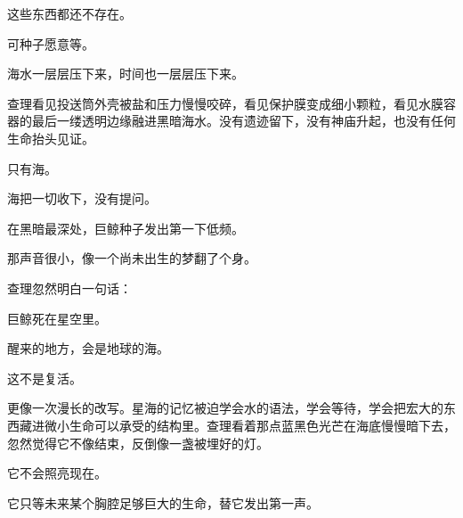 这些东西都还不存在。

可种子愿意等。

海水一层层压下来，时间也一层层压下来。

查理看见投送筒外壳被盐和压力慢慢咬碎，看见保护膜变成细小颗粒，看见水膜容器的最后一缕透明边缘融进黑暗海水。没有遗迹留下，没有神庙升起，也没有任何生命抬头见证。

只有海。

海把一切收下，没有提问。

在黑暗最深处，巨鲸种子发出第一下低频。

那声音很小，像一个尚未出生的梦翻了个身。

查理忽然明白一句话：

巨鲸死在星空里。

醒来的地方，会是地球的海。

这不是复活。

更像一次漫长的改写。星海的记忆被迫学会水的语法，学会等待，学会把宏大的东西藏进微小生命可以承受的结构里。查理看着那点蓝黑色光芒在海底慢慢暗下去，忽然觉得它不像结束，反倒像一盏被埋好的灯。

它不会照亮现在。

它只等未来某个胸腔足够巨大的生命，替它发出第一声。
